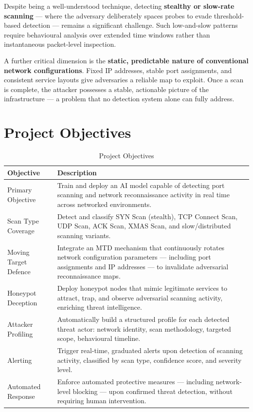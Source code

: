 \documentclass[12pt,a4paper]{report}
\begin{document}
Despite being a well-understood technique, detecting \textbf{stealthy or slow-rate scanning}
--- where the adversary deliberately spaces probes to evade threshold-based detection ---
remains a significant challenge. Such low-and-slow patterns require behavioural analysis over
extended time windows rather than instantaneous packet-level inspection.

A further critical dimension is the \textbf{static, predictable nature of conventional network
configurations}. Fixed IP addresses, stable port assignments, and consistent service layouts
give adversaries a reliable map to exploit. Once a scan is complete, the attacker possesses a
stable, actionable picture of the infrastructure --- a problem that no detection system alone
can fully address.

\chapter{Project Objectives}

\begin{table}[h!]
\centering
\caption{Project Objectives}
\begin{tabular}{@{}L{4.5cm} L{10cm}@{}}
  \toprule
  \textbf{Objective} & \textbf{Description} \\
  \midrule
  Primary Objective
    & Train and deploy an AI model capable of detecting port scanning and network
      reconnaissance activity in real time across networked environments. \\
  \addlinespace
  Scan Type Coverage
    & Detect and classify SYN Scan (stealth), TCP Connect Scan, UDP Scan, ACK Scan,
      XMAS Scan, and slow/distributed scanning variants. \\
  \addlinespace
  Moving Target Defence
    & Integrate an MTD mechanism that continuously rotates network configuration
      parameters --- including port assignments and IP addresses --- to invalidate
      adversarial reconnaissance maps. \\
  \addlinespace
  Honeypot Deception
    & Deploy honeypot nodes that mimic legitimate services to attract, trap, and observe
      adversarial scanning activity, enriching threat intelligence. \\
  \addlinespace
  Attacker Profiling
    & Automatically build a structured profile for each detected threat actor: network
      identity, scan methodology, targeted scope, behavioural timeline. \\
  \addlinespace
  Alerting
    & Trigger real-time, graduated alerts upon detection of scanning activity, classified by
      scan type, confidence score, and severity level. \\
  \addlinespace
  Automated Response
    & Enforce automated protective measures --- including network-level blocking --- upon
      confirmed threat detection, without requiring human intervention. \\
  \bottomrule
\end{tabular}
\label{tab:objectives}
\end{table}
\end{document}
